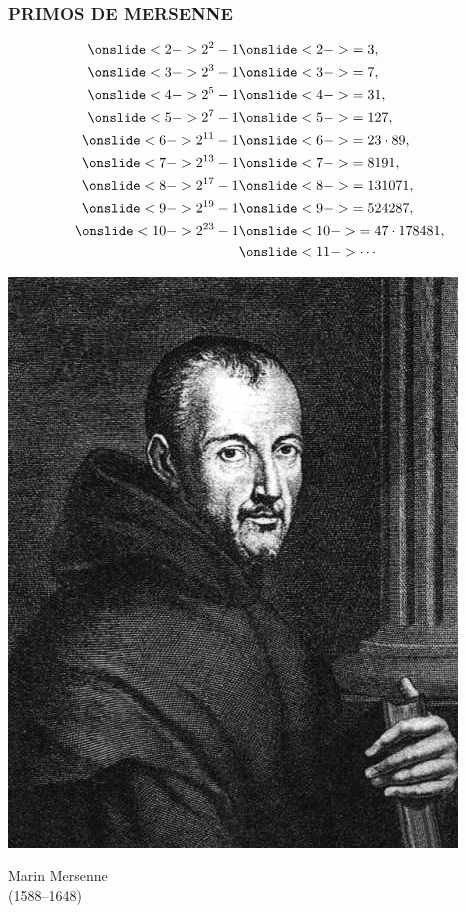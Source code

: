\begin{frame}
  \frametitle{PRIMOS DE MERSENNE}

  \begin{minipage}[t][0.6\textheight]{0.6\textwidth}
    \vspace{-20pt}
    \begin{align*}
      \onslide<2->{2^2 - 1} & \onslide<2->{= 3,} \\
      \onslide<3->{2^3 - 1} & \onslide<3->{= 7,} \\
      \onslide<4->{2^5 - 1} & \onslide<4->{= 31,} \\
      \onslide<5->{2^7 - 1} & \onslide<5->{= 127,} \\
      \onslide<6->{2^{11} - 1} & \onslide<6->{= 23\cdot 89,} \\
      \onslide<7->{2^{13} - 1} & \onslide<7->{= 8191,} \\
      \onslide<8->{2^{17} - 1} & \onslide<8->{= 131071,} \\
      \onslide<9->{2^{19} - 1} & \onslide<9->{= 524287,} \\
      \onslide<10->{2^{23} - 1} & \onslide<10->{= 47\cdot 178481,} \\
      & \onslide<11->{\cdots}
    \end{align*}
  \end{minipage}
  \begin{minipage}[t]{0.35\textwidth}
    \vspace{0pt}\flushright
    \includegraphics[width=.9\textwidth]{mersenne.jpg}

    Marin Mersenne\\
    (1588--1648)
  \end{minipage}
\end{frame}

